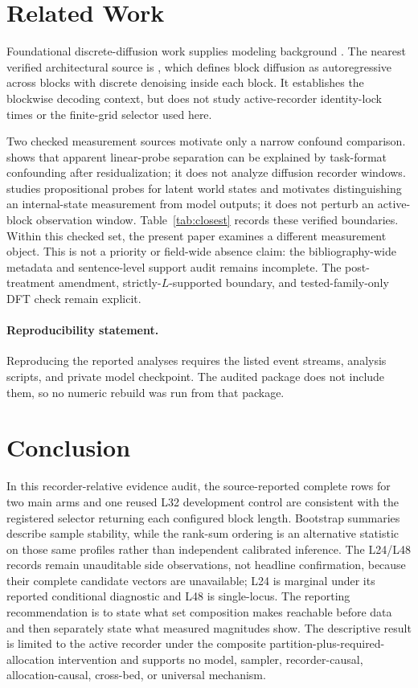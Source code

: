 \documentclass{article}
\begin{document}
\section{Related Work}\label{sec:related}

Foundational discrete-diffusion work supplies modeling background
\citep{austin2021structured,zheng2023reparameterized,lou2024discrete,shi2024simplified}.
The nearest verified architectural source is \citet{arriola2025block}, which
defines block diffusion as autoregressive across blocks with discrete denoising
inside each block. It establishes the blockwise decoding context, but does not
study active-recorder identity-lock times or the finite-grid selector used here.

Two checked measurement sources motivate only a narrow confound comparison.
\citet{sahoo2026linearprobes} shows that apparent linear-probe separation can be
explained by task-format confounding after residualization; it does not analyze
diffusion recorder windows. \citet{feng2024monitoring} studies propositional
probes for latent world states and motivates distinguishing an internal-state
measurement from model outputs; it does not perturb an active-block observation
window. Table~\ref{tab:closest} records these verified boundaries. Within this
checked set, the present paper examines a different measurement object. This is
not a priority or field-wide absence claim: the bibliography-wide metadata and
sentence-level support audit remains incomplete. The post-treatment amendment,
strictly-$L$-supported boundary, and tested-family-only DFT check remain explicit.

\paragraph{Reproducibility statement.}
Reproducing the reported analyses requires the listed event streams, analysis
scripts, and private model checkpoint.  The audited package
does not include them, so no numeric rebuild was run from that package.

\section{Conclusion}\label{sec:conclusion}

In this recorder-relative evidence audit, the source-reported complete rows for
two main arms and one reused L32 development control are consistent with the
registered selector returning each configured block length.  Bootstrap summaries
describe sample stability, while the rank-sum ordering is an alternative
statistic on those same profiles rather than independent calibrated inference.
The L24/L48 records remain unauditable side observations, not headline
confirmation, because their complete candidate vectors are unavailable; L24 is
marginal under its reported conditional diagnostic and L48 is single-locus.  The
reporting recommendation is to state what set composition makes reachable before
data and then separately state what measured magnitudes show.  The descriptive
result is limited to the active recorder under the composite
partition-plus-required-allocation intervention and supports no model, sampler,
recorder-causal, allocation-causal, cross-bed, or universal mechanism.
\end{document}
